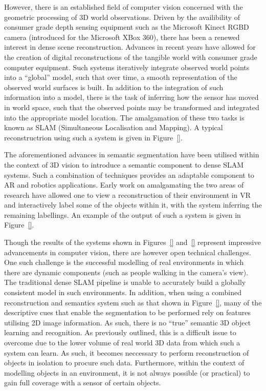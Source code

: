 However, there is an established field of computer vision concerned with the geometric processing 
of 3D world observations. Driven by the availibility of consumer grade depth sensing equipment such 
as the Microsoft Kinect RGBD camera (introduced for the Microsoft XBox 360), there has been a renewed 
interest in dense scene reconstruction. Advances in recent years have allowed for the creation of digital 
reconstructions of the tangible world with consumer grade computer equipment. Such systems iteratively 
integrate observed world points into a ``global'' model, such that over time, a smooth representation 
of the observed world surfaces is built. In addition to the integration of such information into a model, 
there is the task of inferring how the sensor has moved in world space, such that the observed points may 
be transformed and integrated into the appropriate model location. The amalgamation of these two tasks is 
known as SLAM (Simultaneous Localisation and Mapping). A typical reconstructrion using such a system is 
given in Figure~\ref{}.

The aforementioned advances in semantic segmentation have been utilised within the context of 3D vision to 
introduce a semantic component to dense SLAM systems. Such a combination of techniques provides an adaptable 
component to AR and robotics applications. Early work on amalgamating the two areas of research have allowed 
one to view a reconstruction of their environment in VR and interactively label some of the objects within 
it, with the system inferring the remaining labellings. An example of the output of such a system is given 
in Figure~\ref{}.

Though the results of the systems shown in Figures~\ref{} and~\ref{} represent impressive advancements in 
computer vision, there are however open technical challenges. One such challenge is the successful modelling 
of real environments in which there are dynamic components (such as people walking in the camera's view). 
The traditional dense SLAM pipeline is unable to accurately build a globally consistent model in such 
environments. In addition, when using a combined reconstruction and semantics system such as that shown 
in Figure~\ref{}, many of the descriptive cues that enable the segmentation to be performed rely on 
features utilising 2D image information. As such, there is no ``true'' semantic 3D object learning and 
recognition. As previously outlined, this is a difficult issue to overcome due to the lower volume of real 
world 3D data from which such a system can learn. As such, it becomes neccessary to perform reconstruction 
of objects in isolation to procure such data. Furthermore, within the context of modelling objects in an 
environment, it is not always possible (or practical) to gain full coverage with a sensor of certain objects.

